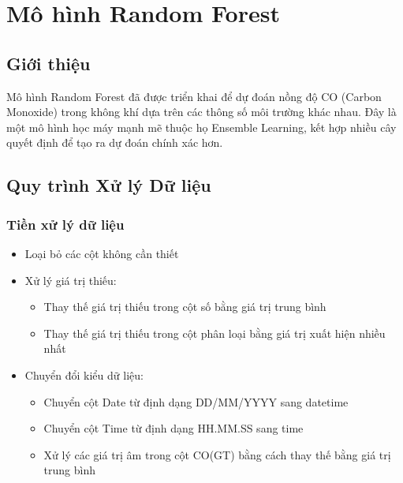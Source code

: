 \section{Mô hình Random Forest}

\subsection{Giới thiệu}
Mô hình Random Forest đã được triển khai để dự đoán nồng độ CO (Carbon Monoxide) trong không khí dựa trên các thông số môi trường khác nhau. Đây là một mô hình học máy mạnh mẽ thuộc họ Ensemble Learning, kết hợp nhiều cây quyết định để tạo ra dự đoán chính xác hơn.

\subsection{Quy trình Xử lý Dữ liệu}

\subsubsection{Tiền xử lý dữ liệu}
\begin{itemize}
    \item Loại bỏ các cột không cần thiết
    \item Xử lý giá trị thiếu:
    \begin{itemize}
        \item Thay thế giá trị thiếu trong cột số bằng giá trị trung bình
        \item Thay thế giá trị thiếu trong cột phân loại bằng giá trị xuất hiện nhiều nhất
    \end{itemize}
    \item Chuyển đổi kiểu dữ liệu:
    \begin{itemize}
        \item Chuyển cột Date từ định dạng DD/MM/YYYY sang datetime
        \item Chuyển cột Time từ định dạng HH.MM.SS sang time
        \item Xử lý các giá trị âm trong cột CO(GT) bằng cách thay thế bằng giá trị trung bình
    \end{itemize}
\end{itemize}

